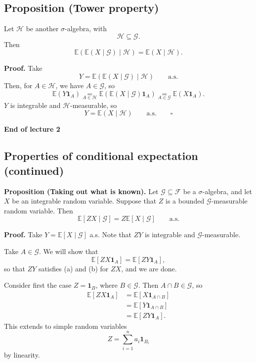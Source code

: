 \documentclass[11pt,a4paper]{article}
\begin{document}
\subsection*{Proposition (Tower property)}

Let $\mathcal{H}$ be another $\sigma$-algebra, with
\[
\mathcal{H}\subseteq\mathcal{G}.
\]
Then
\[
\mathbb{E}\!\left(
\mathbb{E}(X\mid\mathcal{G})\mid\mathcal{H}
\right)
=
\mathbb{E}(X\mid\mathcal{H}).
\]

\noindent\textbf{Proof.}
Take
\[
Y=
\mathbb{E}\!\left(
\mathbb{E}(X\mid\mathcal{G})\mid\mathcal{H}
\right)
\qquad\text{a.s.}
\]
Then, for $A\in\mathcal{H}$, we have $A\in\mathcal{G}$, so
\[
\mathbb{E}(Y\mathbf{1}_A)
\underset{A\in\mathcal{H}}{=}
\mathbb{E}\!\left(
\mathbb{E}(X\mid\mathcal{G})\mathbf{1}_A
\right)
\underset{A\in\mathcal{G}}{=}
\mathbb{E}(X\mathbf{1}_A).
\]
$Y$ is integrable and $\mathcal{H}$-measurable, so
\[
Y=\mathbb{E}(X\mid\mathcal{H})
\qquad\text{a.s.}
\qquad\square
\]

\begin{center}
\textbf{End of lecture 2}
\end{center}
\subsection*{Properties of conditional expectation (continued)}

\noindent\textbf{Proposition (Taking out what is known).}
Let $\mathcal{G}\subseteq\mathcal{F}$ be a $\sigma$-algebra, and let $X$ be an integrable random variable. Suppose that $Z$ is a bounded $\mathcal{G}$-measurable random variable. Then
\[
\mathbb{E}[ZX\mid\mathcal{G}]
=
Z\mathbb{E}[X\mid\mathcal{G}]
\qquad \text{a.s.}
\]

\noindent\textbf{Proof.}
Take $Y=\mathbb{E}[X\mid\mathcal{G}]$ a.s. Note that $ZY$ is integrable and $\mathcal{G}$-measurable.

Take $A\in\mathcal{G}$. We will show that
\[
\mathbb{E}[ZX\mathbf{1}_A]
=
\mathbb{E}[ZY\mathbf{1}_A],
\]
so that $ZY$ satisfies (a) and (b) for $ZX$, and we are done.

Consider first the case $Z=\mathbf{1}_B$, where $B\in\mathcal{G}$. Then $A\cap B\in\mathcal{G}$, so
\[
\begin{aligned}
\mathbb{E}[ZX\mathbf{1}_A]
&=\mathbb{E}[X\mathbf{1}_{A\cap B}]\\
&=\mathbb{E}[Y\mathbf{1}_{A\cap B}]\\
&=\mathbb{E}[ZY\mathbf{1}_A].
\end{aligned}
\]
This extends to simple random variables
\[
Z=\sum_{i=1}^{n}a_i\mathbf{1}_{B_i}
\]
by linearity.
\end{document}
